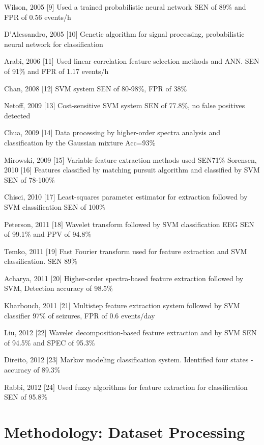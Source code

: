\documentclass{llncs}       %
\begin{document}
Wilson, 2005 $[$9$]$  Used a trained probabilistic neural network SEN of 89\% and FPR of 0.56 events/h 

D'Alessandro, 2005 $[$10$]$  Genetic algorithm for signal processing, probabilistic neural network for classification 

Arabi, 2006 $[$11$]$  Used linear correlation feature selection methods and ANN. SEN of 91\% and FPR of 1.17 events/h 

Chan, 2008 $[$12$]$  SVM system SEN of 80-98\%, FPR of 38\% 

Netoff, 2009 $[$13$]$  Cost-sensitive SVM system SEN of 77.8\%, no false positives detected 

Chua, 2009 $[$14$]$  Data processing by higher-order spectra analysis and classification by the Gaussian mixture Acc=93\% 

Mirowski, 2009 $[$15$]$  Variable feature extraction methods used SEN71\% 
Sorensen, 2010 $[$16$]$  Features classified by matching pursuit algorithm and classified by SVM SEN of 78-100\% 

Chisci, 2010 $[$17$]$  Least-squares parameter estimator for extraction followed by SVM classification SEN of 100\% 

Peterson, 2011 $[$18$]$  Wavelet transform followed by SVM classification EEG SEN of 99.1\% and PPV of 94.8\% 

Temko, 2011 $[$19$]$  Fast Fourier transform used for feature extraction and SVM classification.  SEN 89\% 

Acharya, 2011 $[$20$]$  Higher-order spectra-based feature extraction followed by SVM, Detection accuracy of 98.5\% 

Kharbouch, 2011 $[$21$]$  Multistep feature extraction system followed by SVM classifier 97\% of seizures, FPR of 0.6 events/day 

Liu, 2012 $[$22$]$  Wavelet decomposition-based feature extraction  and by SVM  SEN of 94.5\% and SPEC of 95.3\% 

Direito, 2012 $[$23$]$  Markov modeling classification system. Identified four states - accuracy of 89.3\% 

Rabbi, 2012 $[$24$]$  Used fuzzy algorithms for feature extraction for classification SEN of 95.8\%


\paragraph{}
\section{Methodology: Dataset Processing}
\label{sec:2}
\end{document}
